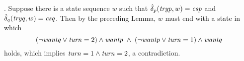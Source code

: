 \documentclass[12pt]{article}
\newcommand{\id}[1]{\mbox{\it #1\/}}
\begin{document}
\vspace{1em}
.
Suppose there is a state sequence $w$ such that $\hat{\delta}_p(\id{tryp},w)=\id{csp}$
and $\hat{\delta}_q(\id{tryq},w)=\id{csq}$.
Then by the preceding Lemma, $w$ must end with a state in which
\[(\neg\id{wantq}\vee\id{turn}=2)\wedge\id{wantp}\;\wedge\;
(\neg\id{wantp}\vee\id{turn}=1)\wedge\id{wantq}
\]
holds, which implies $\id{turn}=1\wedge\id{turn}=2$, a contradiction.
\end{document}
